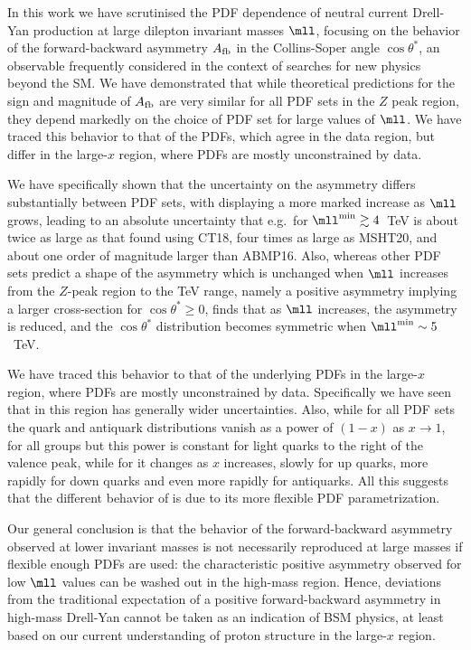 
In this work we have scrutinised the PDF dependence of  neutral current
Drell-Yan production
at large dilepton invariant masses $\mll$, focusing on the behavior
of the forward-backward asymmetry $A_{\rm fb}$
in the Collins-Soper angle $\cos\theta^*$, an observable frequently
considered in the context of searches for new physics beyond the SM.
%
We have demonstrated that while theoretical
predictions for the sign and magnitude of $A_{\rm fb}$ are very
similar for all PDF sets in the
$Z$ peak region, they
depend markedly on the choice of PDF set for  large values of $\mll$. 
We have traced this behavior to that of the PDFs, which agree in the
data region, but differ in the large-$x$
region, where PDFs are mostly unconstrained by data.

We have specifically shown that the uncertainty on the asymmetry
differs substantially between PDF sets, with  displaying
a more marked increase as  $\mll$ grows, leading to
an absolute uncertainty that e.g.\ for $\mll^{\rm min}\gtrsim4$~TeV
is about twice as large as that found using CT18, 
four times as large as MSHT20,
and about one order of magnitude larger than ABMP16.
%
Also, whereas other PDF sets predict a shape of the asymmetry
which is unchanged when  $\mll$ increases from the $Z$-peak region to
the TeV range, namely a 
positive
asymmetry implying a larger cross-section  for $\cos\theta^*\ge 0$,  finds that as
$\mll$ increases, the asymmetry is reduced, and the $\cos\theta^*$ distribution
becomes symmetric when $\mll^{\rm min}\sim5$~TeV.

We have traced this behavior to that of the underlying
PDFs in the large-$x$ region, where PDFs are mostly unconstrained by
data.
%
Specifically we have seen that in this region  has
generally wider uncertainties.
%
Also, while for  all PDF  sets the
quark and antiquark distributions vanish as
a power of $(1-x)$ as $x\to 1$, for all groups but  this power is
constant for light quarks to the right of the valence peak, while for
 it changes as $x$ increases, slowly for up quarks, more rapidly
for down quarks and even more rapidly for antiquarks.
%
All this suggests that the different behavior of
 is due to its more flexible PDF parametrization.

Our general conclusion is that the 
behavior of the forward-backward asymmetry
observed at lower invariant masses is not necessarily reproduced at
large masses if flexible enough
PDFs are used:  the characteristic positive asymmetry observed
for low $\mll$ values
can be washed out in the high-mass region.
%
Hence, deviations from the traditional expectation of a positive forward-backward
asymmetry in high-mass Drell-Yan cannot be taken as an indication of 
BSM physics,
at least based on  our current understanding of proton structure in the large-$x$ region.

